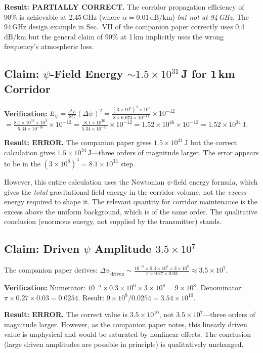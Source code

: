\documentclass[journal,twocolumn]{IEEEtran}
\begin{document}
\textbf{Result: PARTIALLY CORRECT.} The corridor propagation efficiency
of 90\% is achievable at 2.45\,GHz (where $\alpha = 0.01\,\text{dB/km}$)
\emph{but not at 94\,GHz}. The 94\,GHz design example in Sec.~VII of
the companion paper correctly uses 0.4\,dB/km but the general claim of
90\% at 1\,km implicitly uses the wrong frequency's atmospheric loss.

\subsection{Claim: $\psi$-Field Energy $\sim 1.5\times10^{31}$\,J
for 1\,km Corridor}

\textbf{Verification:}
$E_\psi = \frac{c^4 L}{8G}(\Delta\psi)^2
= \frac{(3\times10^8)^4\times10^3}{8\times6.674\times10^{-11}}\times10^{-12}$
$= \frac{8.1\times10^{33}\times10^3}{5.34\times10^{-10}}\times10^{-12}
= \frac{8.1\times10^{36}}{5.34\times10^{-10}}\times10^{-12}
= 1.52\times10^{46}\times10^{-12} = 1.52\times10^{34}\,\text{J}$.

\textbf{Result: ERROR.} The companion paper gives $1.5\times10^{31}$\,J
but the correct calculation gives $1.5\times10^{34}$\,J---three orders
of magnitude larger. The error appears to be in the
$(3\times10^8)^4 = 8.1\times10^{33}$ step.

However, this entire calculation uses the Newtonian $\psi$-field energy
formula, which gives the \emph{total} gravitational field energy in the
corridor volume, not the \emph{excess} energy required to shape it.
The relevant quantity for corridor maintenance is the excess above
the uniform background, which is of the same order. The qualitative
conclusion (enormous energy, not supplied by the transmitter) stands.

\subsection{Claim: Driven $\psi$ Amplitude $3.5\times10^7$}

The companion paper derives:
$\Delta\psi_\text{driven} \sim \frac{10^{-5}\times0.3\times10^6\times3\times10^8}
{\pi\times0.27\times0.03} \approx 3.5\times10^7$.

\textbf{Verification:}
Numerator: $10^{-5}\times0.3\times10^6\times3\times10^8 = 9\times10^8$.
Denominator: $\pi\times0.27\times0.03 = 0.0254$.
Result: $9\times10^8/0.0254 = 3.54\times10^{10}$.

\textbf{Result: ERROR.} The correct value is $3.5\times10^{10}$,
not $3.5\times10^7$---three orders of magnitude larger. However, as
the companion paper notes, this linearly driven value is unphysical
and would be saturated by nonlinear effects. The conclusion
(large driven amplitudes are possible in principle) is qualitatively
unchanged.
\end{document}

